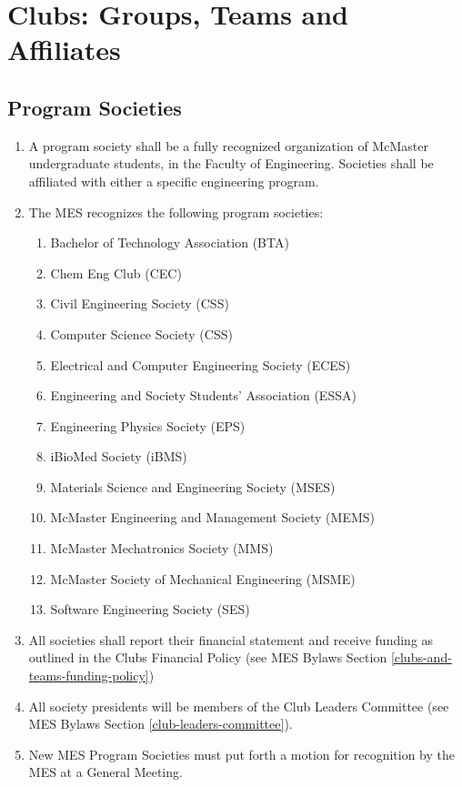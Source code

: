 \section{Clubs: Groups, Teams and Affiliates}
\label{clubs-groups-teams-and-affiliates}

\subsection{Program Societies}
\label{program-societies}
\begin{enumerate}
 \item
  A program society shall be a fully recognized organization of McMaster
  undergraduate students, in the Faculty of Engineering. Societies shall
  be affiliated with either a specific engineering program.
 \item
  The MES recognizes the following program societies:

  \begin{enumerate}
   \item
    Bachelor of Technology Association (BTA)
   \item
    Chem Eng Club (CEC)
   \item
    Civil Engineering Society (CSS)
   \item
    Computer Science Society (CSS)
   \item
    Electrical and Computer Engineering Society (ECES)
   \item
    Engineering and Society Students' Association (ESSA)
   \item
    Engineering Physics Society (EPS)
   \item
    iBioMed Society (iBMS)
   \item
    Materials Science and Engineering Society (MSES)
   \item
    McMaster Engineering and Management Society (MEMS)
   \item
    McMaster Mechatronics Society (MMS)
   \item
    McMaster Society of Mechanical Engineering (MSME)
   \item
    Software Engineering Society (SES)
  \end{enumerate}
 \item
  All societies shall report their financial statement and receive
  funding as outlined in the Clubs Financial Policy (see MES Bylaws
  Section \ref{clubs-and-teams-funding-policy})
 \item
  All society presidents will be members of the Club Leaders Committee
  (see MES Bylaws Section \ref{club-leaders-committee}).
 \item
  New MES Program Societies must put forth a motion for recognition by
  the MES at a General Meeting.

\end{enumerate}

